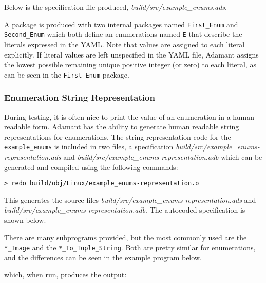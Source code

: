 Below is the specification file produced, \textit{build/src/example\_enums.ads}.


A package is produced with two internal packages named \texttt{First\_Enum} and \texttt{Second\_Enum} which both define an enumerations named \texttt{E} that describe the literals expressed in the YAML. Note that values are assigned to each literal explicitly. If literal values are left unspecified in the YAML file, Adamant assigns the lowest possible remaining unique positive integer (or zero) to each literal, as can be seen in the \texttt{First\_Enum} package.

\subsubsection{Enumeration String Representation}

During testing, it is often nice to print the value of an enumeration in a human readable form. Adamant has the ability to generate human readable string representations for enumerations. The string representation code for the \texttt{example\_enums} is included in two files, a specification \textit{build/src/example\_enums-representation.ads} and \textit{build/src/example\_enums-representation.adb} which can be generated and compiled using the following commands: 

\vspace{5mm} %
\begin{verbatim}
> redo build/obj/Linux/example_enums-representation.o
\end{verbatim}
\vspace{5mm} %

This generates the source files \textit{build/src/example\_enums-representation.ads} and \textit{build/src/example\_enums-representation.adb}. The autocoded specification is shown below.


There are many subprograms provided, but the most commonly used are the \texttt{*\_Image} and the \texttt{*\_To\_Tuple\_String}. Both are pretty similar for enumerations, and the differences can be seen in the example program below.


which, when run, produces the output:


